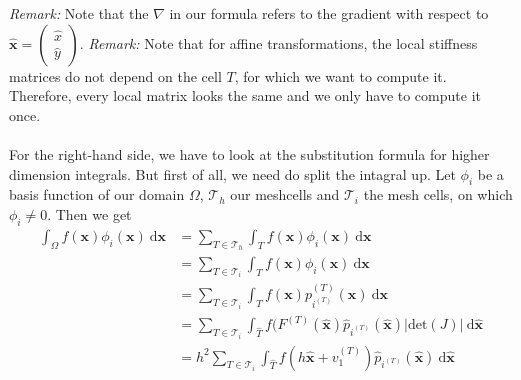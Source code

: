 \documentclass[a4paper,12pt]{article}
\begin{document}
\textit{Remark:} Note that the $\nabla$ in our formula refers to the gradient with respect to $\bm{\hat x}=\begin{pmatrix} \hat x \\ \hat y\end{pmatrix}$.
\textit{Remark:} Note that for affine transformations, the local stiffness matrices do not depend on the cell $T$, for which we want to compute it. Therefore, every local matrix looks the same and we only have to compute it once.
\\ \\
For the right-hand side, we have to look at the substitution formula for higher dimension integrals. But first of all, we need do split the intagral up. Let $\phi_i$ be a basis function of our domain $\Omega$, $\mathscr{T}_h$ our meshcells and $\mathscr{T}_i$ the mesh cells, on which $\phi_i \neq 0$. Then we get
\begin{align*}
\int_{\Omega}f(\bm{x})\phi_i(\bm{x})\ \mbox{d}\bm{x}&=\sum_{T\in\mathscr{T}_h} \int_Tf(\bm{x})\phi_i(\bm{x})\ \mbox{d}\bm{x} \\
													&=\sum_{T\in\mathscr{T}_i} \int_Tf(\bm{x})\phi_i(\bm{x})\ \mbox{d}\bm{x} \\
													&=\sum_{T\in\mathscr{T}_i} \int_Tf(\bm{x})p^{(T)}_{i^{(T)}}(\bm{x})\ \mbox{d}\bm{x} \\
													&=\sum_{T\in\mathscr{T}_i} \int_{\hat T}f(F^{(T)}(\bm{\hat x})\hat p_{i^{(T)}}(\bm{\hat x})|\mbox{det}(J)|\ \mbox{d}\bm{\hat x} \\
													&=h^2\sum_{T\in\mathscr{T}_i} \int_{\hat T}f(h\bm{\hat x}+v^{(T)}_1)\hat p_{i^{(T)}}(\bm{\hat x})\ \mbox{d}\bm{\hat x}						
\end{align*}
\end{document}
